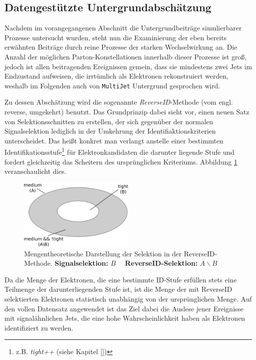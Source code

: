 \subsection{Datengestützte Untergrundabschätzung}
\label{afb:multijet}
Nachdem im vorangegangenen Abschnitt die Untergrundbeiträge simulierbarer
Prozesse untersucht wurden, steht nun die Examinierung der eben bereits
erwähnten Beiträge durch reine Prozesse der starken Wechselwirkung an. Die
Anzahl der möglichen Parton-Konstellationen innerhalb dieser Prozesse ist groß,
jedoch ist allen beitragenden Ereignissen gemein, dass sie mindestens zwei Jets
im Endzustand aufweisen, die irrtümlich als Elektronen rekonstruiert werden,
weshalb im Folgenden auch von \texttt{MultiJet} Untergrund gesprochen wird.

Zu dessen Abschätzung wird die sogenannte \textit{ReverseID}-Methode (vom engl.
reverse, umgekehrt) benutzt. Das Grundprinzip dabei sieht vor, einen neuen Satz
von Selektionsschnitten zu erstellen, der sich gegenüber der normalen
Signalselektion lediglich in der Umkehrung der Identifiaktionskriterien
unterscheidet. Das heißt konkret man verlangt anstelle einer bestimmten
Identifikationsstufe\footnote{z.B. \textit{tight++} (siehe Kapitel
\ref{})} für Elektronkandidaten die darunter liegende Stufe und fordert
gleichzeitig das Scheitern des ursprünglichen Kriteriums. Abbildung
\ref{fig:reverseID} veranschaulicht dies.
\begin{figure}[h]
    \centering
    \includegraphics[width=0.5\textwidth]{img/reverseID}
    \caption[Mengentheoretische Darstellung der Selektion in der
        ReverseID-Methode]
        {Mengentheoretische Darstellung der Selektion in der ReverseID-Methode.
        \textbf{Signalselektion:} $B\quad$ \textbf{ReverseID-Selektion:}
        $A \backslash B$}
    \label{fig:reverseID}
\end{figure}
Da die Menge der Elektronen, die eine bestimmte ID-Stufe erfüllen stets eine
Teilmenge der darunterliegenden Stufe ist, ist die Menge der mit ReverseID
selektierten Elektronen statistisch unabhängig von der ursprünglichen Menge.
Auf den vollen Datensatz angewendet ist das Ziel dabei die Auslese jener
Ereignisse mit signalähnlichen Jets, die eine hohe Wahrscheinlichkeit haben als
Elektronen identifiziert zu werden.

